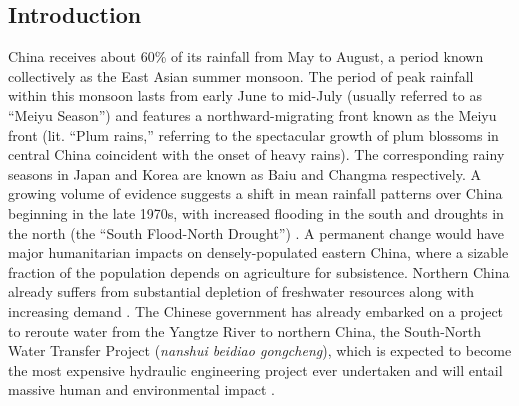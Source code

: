 \documentclass[draft,grl]{AGUTeX}
\begin{document}


\begin{article}

\section{Introduction}
 
 	China receives about 60\% of its rainfall from May to August, a period known collectively as the East Asian summer monsoon. The period of peak rainfall within this monsoon lasts from early June to mid-July (usually referred to as ``Meiyu Season'') and features a northward-migrating front known as the Meiyu front (lit. ``Plum rains,'' referring to the spectacular growth of plum blossoms in central China coincident with the onset of heavy rains). The corresponding rainy seasons in Japan and Korea are known as Baiu and Changma respectively. A growing volume of evidence suggests a shift in mean rainfall patterns over China beginning in the late 1970s, with increased flooding in the south and droughts in the north (the ``South Flood-North Drought'') \citep{Hu1997,Gong2002,Nigam2013}. A permanent change would have major humanitarian impacts on densely-populated eastern China, where a sizable fraction of the population depends on agriculture for subsistence. Northern China already suffers from substantial depletion of freshwater resources along with increasing demand \citep{Currell2012,Gleeson2012}. The Chinese government has already embarked on a project to reroute water from the Yangtze River to northern China, the South-North Water Transfer Project (\textit{nanshui beidiao gongcheng}), which is expected to become the most expensive hydraulic engineering project ever undertaken and will entail massive human and environmental impact \citep{Magee2011}.
 

\end{article}
\end{document}
